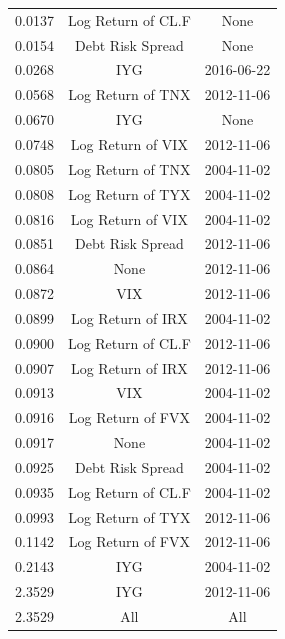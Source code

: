 \documentclass[11pt,3p,review,authoryear]{elsarticle}
\theoremstyle{definition}
\begin{document}
\begin{table}[ht]
\begin{tabular}{ccc}
    0.0137 & Log Return of CL.F & None \\ 
    0.0154 & Debt Risk Spread & None \\ 
    0.0268 & IYG & 2016-06-22 \\ 
    0.0568 & Log Return of TNX & 2012-11-06 \\ 
    0.0670 & IYG & None \\ 
    0.0748 & Log Return of VIX & 2012-11-06 \\ 
    0.0805 & Log Return of TNX & 2004-11-02 \\ 
    0.0808 & Log Return of TYX & 2004-11-02 \\ 
    0.0816 & Log Return of VIX & 2004-11-02 \\ 
    0.0851 & Debt Risk Spread & 2012-11-06 \\ 
    0.0864 & None & 2012-11-06 \\ 
    0.0872 & VIX & 2012-11-06 \\ 
    0.0899 & Log Return of IRX & 2004-11-02 \\ 
    0.0900 & Log Return of CL.F & 2012-11-06 \\ 
    0.0907 & Log Return of IRX & 2012-11-06 \\ 
    0.0913 & VIX & 2004-11-02 \\ 
    0.0916 & Log Return of FVX & 2004-11-02 \\ 
    0.0917 & None & 2004-11-02 \\ 
    0.0925 & Debt Risk Spread & 2004-11-02 \\ 
    0.0935 & Log Return of CL.F & 2004-11-02 \\ 
    0.0993 & Log Return of TYX & 2012-11-06 \\ 
    0.1142 & Log Return of FVX & 2012-11-06 \\ 
    0.2143 & IYG & 2004-11-02 \\ 
    2.3529 & IYG & 2012-11-06 \\ 
    \rowcolor{red} 2.3529 & All & All \\
     \hline
  \end{tabular}
  
  \endgroup
  \end{table}
\end{document}
